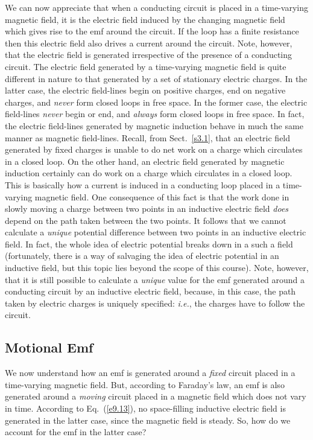 We can now appreciate that when a conducting circuit is placed in a
time-varying magnetic field, it is the electric field induced by the changing
magnetic field which gives rise to the emf around the circuit. If the loop has a
finite resistance then this electric field also drives a current around the circuit.
Note, however, that the electric field is generated irrespective of the
presence of a conducting circuit. The electric field generated by a time-varying
magnetic field is quite different in nature to that generated by a set 
of stationary
electric charges. In the latter case, the electric field-lines begin on
positive charges, end on negative charges, and {\em  never}\/ form closed loops
in free space. In the former case, the electric field-lines {\em never}\/ begin or
end, and {\em  always}\/ form closed loops in free space. In fact, the electric
field-lines generated by magnetic induction behave in much the same
manner as magnetic field-lines. Recall, from Sect.~\ref{s3.1}, that  an electric
field generated by fixed charges is unable to do net work on a charge
which circulates in a closed loop. On the other hand, an electric
field generated by magnetic induction certainly can do work on a charge
which circulates in a closed loop. This is basically how a current is induced in
a conducting loop placed in a time-varying magnetic field. One consequence of this
fact 
is that the work done in slowly moving a charge
between two points in an inductive electric field {\em does}\/ depend on the
path taken between the two points. It follows that we cannot
calculate  a {\em unique}\/ potential difference between two points in an inductive
electric field. In fact, the whole idea of electric potential breaks down
in a such a field (fortunately, there is a way of
salvaging the idea of electric potential in an inductive  field, but this topic
lies beyond the scope of this course). Note, however, that it is still
possible to calculate a {\em unique} value for the emf generated around a conducting
circuit by an inductive electric field, because, in this case, the path taken by
electric charges is uniquely specified: {\em i.e.}, the charges have 
to follow the 
circuit.

\subsection{Motional Emf}\label{s9.4}
We now understand how an emf is generated around a {\em fixed}\/ circuit placed in
a time-varying magnetic field. But, according to Faraday's law, an
emf is also generated around a {\em moving} circuit placed in a  magnetic
field which does not vary in time. 
According to
Eq.~(\ref{e9.13}), no space-filling inductive
electric field is generated in the latter case,
since   the magnetic field is steady. So, how do we account for the emf in the latter
 case?

